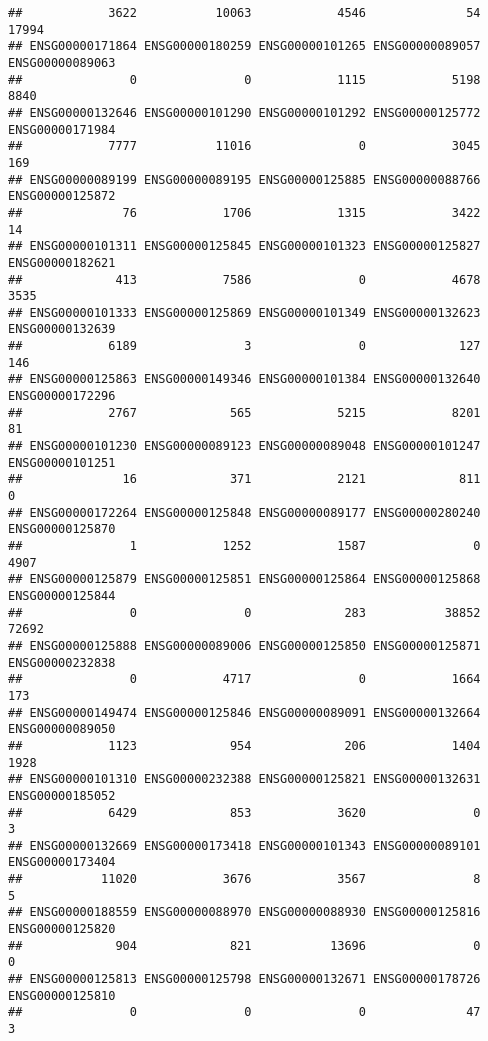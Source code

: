 \documentclass[
]{article}
\begin{document}
\begin{verbatim}
##            3622           10063            4546              54           17994 
## ENSG00000171864 ENSG00000180259 ENSG00000101265 ENSG00000089057 ENSG00000089063 
##               0               0            1115            5198            8840 
## ENSG00000132646 ENSG00000101290 ENSG00000101292 ENSG00000125772 ENSG00000171984 
##            7777           11016               0            3045             169 
## ENSG00000089199 ENSG00000089195 ENSG00000125885 ENSG00000088766 ENSG00000125872 
##              76            1706            1315            3422              14 
## ENSG00000101311 ENSG00000125845 ENSG00000101323 ENSG00000125827 ENSG00000182621 
##             413            7586               0            4678            3535 
## ENSG00000101333 ENSG00000125869 ENSG00000101349 ENSG00000132623 ENSG00000132639 
##            6189               3               0             127             146 
## ENSG00000125863 ENSG00000149346 ENSG00000101384 ENSG00000132640 ENSG00000172296 
##            2767             565            5215            8201              81 
## ENSG00000101230 ENSG00000089123 ENSG00000089048 ENSG00000101247 ENSG00000101251 
##              16             371            2121             811               0 
## ENSG00000172264 ENSG00000125848 ENSG00000089177 ENSG00000280240 ENSG00000125870 
##               1            1252            1587               0            4907 
## ENSG00000125879 ENSG00000125851 ENSG00000125864 ENSG00000125868 ENSG00000125844 
##               0               0             283           38852           72692 
## ENSG00000125888 ENSG00000089006 ENSG00000125850 ENSG00000125871 ENSG00000232838 
##               0            4717               0            1664             173 
## ENSG00000149474 ENSG00000125846 ENSG00000089091 ENSG00000132664 ENSG00000089050 
##            1123             954             206            1404            1928 
## ENSG00000101310 ENSG00000232388 ENSG00000125821 ENSG00000132631 ENSG00000185052 
##            6429             853            3620               0               3 
## ENSG00000132669 ENSG00000173418 ENSG00000101343 ENSG00000089101 ENSG00000173404 
##           11020            3676            3567               8               5 
## ENSG00000188559 ENSG00000088970 ENSG00000088930 ENSG00000125816 ENSG00000125820 
##             904             821           13696               0               0 
## ENSG00000125813 ENSG00000125798 ENSG00000132671 ENSG00000178726 ENSG00000125810 
##               0               0               0              47               3 

\end{verbatim}
\end{document}
